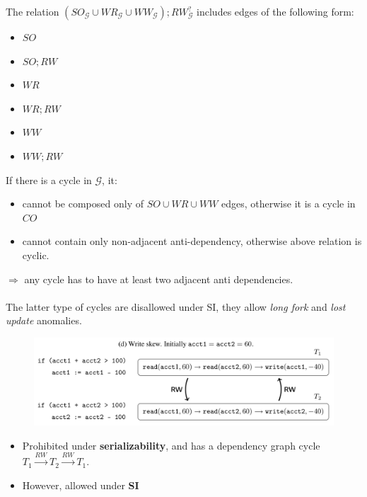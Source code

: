 \documentclass{beamer}
\begin{document}
\begin{frame}
	The relation $(SO_\mathcal{G} \cup WR_\mathcal{G} \cup WW_\mathcal{G}); RW_\mathcal{G}^?$ includes edges of the following form:
	\begin{multicols}{3}
		\begin{itemize}
			\item $SO$
			\item $SO;RW$
			\item $WR$
			\item $WR;RW$
			\item $WW$
			\item $WW;RW$
		\end{itemize}
	\end{multicols}
	If there is a cycle in $\mathcal{G}$, it:
	\begin{itemize}
		\item cannot be composed only of $SO\cup WR \cup WW$ edges, otherwise it is a cycle in $CO$
		\item cannot contain only non-adjacent anti-dependency, otherwise above relation is cyclic.
	\end{itemize}
	$\Rightarrow$ any cycle has to have at least two adjacent anti dependencies. \\
	\hfill \\
	The latter type of cycles are disallowed under SI, they allow \textit{long fork} and \textit{lost update} anomalies.
\end{frame}


\begin{frame}
	\begin{figure}
		\includegraphics[scale=0.25]{fig2d}
	\end{figure}
	\begin{itemize}
		\item Prohibited under \textbf{serializability}, and has a dependency graph cycle $ T_1 \xrightarrow{RW} T_2 \xrightarrow{RW} T_1 $.
		\item However, allowed under \textbf{SI}
	\end{itemize}
\end{frame}
\end{document}
